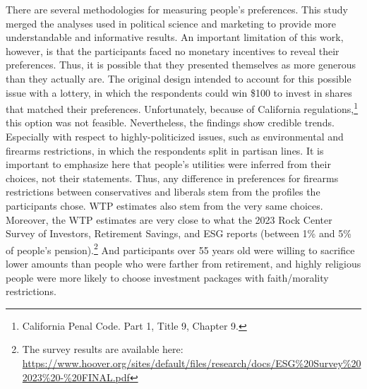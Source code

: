\documentclass[
  12pt,
]{article}
\begin{document}
There are several methodologies for measuring people's preferences. This study merged the analyses used in political science and marketing to provide more understandable and informative results. An important limitation of this work, however, is that the participants faced no monetary incentives to reveal their preferences. Thus, it is possible that they presented themselves as more generous than they actually are. The original design intended to account for this possible issue with a lottery, in which the respondents could win \$100 to invest in shares that matched their preferences. Unfortunately, because of California regulations,\footnote{California Penal Code. Part 1, Title 9, Chapter 9.} this option was not feasible. Nevertheless, the findings show credible trends. Especially with respect to highly-politicized issues, such as environmental and firearms restrictions, in which the respondents split in partisan lines. It is important to emphasize here that people's utilities were inferred from their choices, not their statements. Thus, any difference in preferences for firearms restrictions between conservatives and liberals stem from the profiles the participants chose. WTP estimates also stem from the very same choices. Moreover, the WTP estimates are very close to what the 2023 Rock Center Survey of Investors, Retirement Savings, and ESG reports (between 1\% and 5\% of people's pension).\footnote{The survey results are available here: \url{https://www.hoover.org/sites/default/files/research/docs/ESG\%20Survey\%202023\%20-\%20FINAL.pdf}} And participants over 55 years old were willing to sacrifice lower amounts than people who were farther from retirement, and highly religious people were more likely to choose investment packages with faith/morality restrictions.
\end{document}
